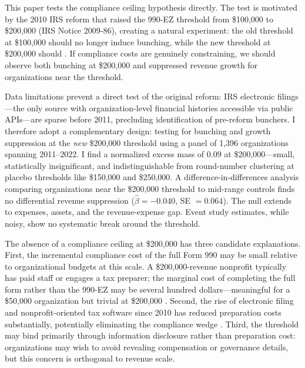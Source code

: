 \documentclass[12pt]{article}
\begin{document}
This paper tests the compliance ceiling hypothesis directly. The test is motivated by the 2010 IRS reform that raised the 990-EZ threshold from \$100,000 to \$200,000 (IRS Notice 2009-86), creating a natural experiment: the old threshold at \$100,000 should no longer induce bunching, while the new threshold at \$200,000 should \citep{irs2009notice}. If compliance costs are genuinely constraining, we should observe both bunching at \$200,000 and suppressed revenue growth for organizations near the threshold.

Data limitations prevent a direct test of the original reform: IRS electronic filings---the only source with organization-level financial histories accessible via public APIs---are sparse before 2011, precluding identification of pre-reform bunchers. I therefore adopt a complementary design: testing for bunching and growth suppression at the \textit{new} \$200,000 threshold using a panel of 1,396 organizations spanning 2011--2022. I find a normalized excess mass of 0.09 at \$200,000---small, statistically insignificant, and indistinguishable from round-number clustering at placebo thresholds like \$150,000 and \$250,000. A difference-in-differences analysis comparing organizations near the \$200,000 threshold to mid-range controls finds no differential revenue suppression ($\hat{\beta} = -0.040$, SE $= 0.064$). The null extends to expenses, assets, and the revenue-expense gap. Event study estimates, while noisy, show no systematic break around the threshold.

The absence of a compliance ceiling at \$200,000 has three candidate explanations. First, the incremental compliance cost of the full Form 990 may be small relative to organizational budgets at this scale. A \$200,000-revenue nonprofit typically has paid staff or engages a tax preparer; the marginal cost of completing the full form rather than the 990-EZ may be several hundred dollars---meaningful for a \$50,000 organization but trivial at \$200,000 \citep{deboer2013effects}. Second, the rise of electronic filing and nonprofit-oriented tax software since 2010 has reduced preparation costs substantially, potentially eliminating the compliance wedge \citep{yetman2012how}. Third, the threshold may bind primarily through information disclosure rather than preparation cost: organizations may wish to avoid revealing compensation or governance details, but this concern is orthogonal to revenue scale.
\end{document}
